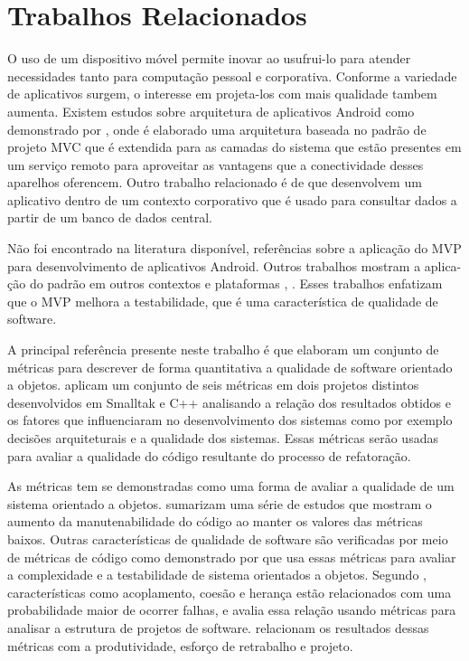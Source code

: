 \documentclass[conference]{IEEEtran}
\begin{document}
\section{Trabalhos Relacionados}

O uso de um dispositivo móvel permite inovar ao usufrui-lo para atender
necessidades tanto para computação pessoal e corporativa. Conforme a variedade
de aplicativos surgem, o interesse em projeta-los com mais qualidade tambem
aumenta. Existem estudos sobre arquitetura de aplicativos Android como
demonstrado por \cite{BMVC}, onde é elaborado uma arquitetura baseada no
padrão de projeto MVC que é extendida para as camadas do sistema que estão
presentes em um serviço remoto para aproveitar as vantagens que a conectividade
desses aparelhos oferencem. Outro trabalho relacionado é
de \cite{corporateandroid} que desenvolvem um aplicativo dentro de um
contexto corporativo que é usado para consultar dados a partir de um banco de
dados central.

Não foi encontrado na literatura disponível, referências sobre a aplicação do
MVP para desenvolvimento de aplicativos Android. Outros trabalhos mostram a
aplica- ção do padrão em outros contextos e plataformas  \cite{presenterfirst},
\cite{yangmvp}. Esses trabalhos enfatizam que o MVP melhora a
testabilidade, que é uma característica de qualidade de software.

A principal referência presente neste trabalho é \cite{cksuite} que
elaboram um conjunto de métricas para descrever de forma quantitativa a
qualidade de software orientado a objetos. \cite{cksuite} aplicam um
conjunto de seis métricas em dois projetos distintos desenvolvidos em Smalltak e
C++ analisando a relação dos resultados obtidos e os fatores que influenciaram
no desenvolvimento dos sistemas como por exemplo decisões arquiteturais e a
qualidade dos sistemas. Essas métricas serão usadas para avaliar a qualidade do
código resultante do processo de refatoração.

As métricas \cite{cksuite} tem se demonstradas como uma forma de avaliar a
qualidade de um sistema orientado a objetos. \cite{Dubey:2011} sumarizam
uma série de estudos que mostram o aumento da manutenabilidade do código ao
manter os valores das métricas baixos. Outras características de
qualidade de software são verificadas por meio de métricas de código
como demonstrado por \cite{Khalid:2010} que usa essas métricas para
avaliar a complexidade e a testabilidade de sistema orientados a objetos.
Segundo \cite{Briand:2000}, características como acoplamento, coesão e
herança estão relacionados com uma probabilidade maior de ocorrer falhas, e
avalia essa relação usando métricas para analisar a estrutura de projetos de
software. \cite{CK:98} relacionam os resultados dessas métricas com a
produtividade, esforço de retrabalho e projeto.
\end{document}
